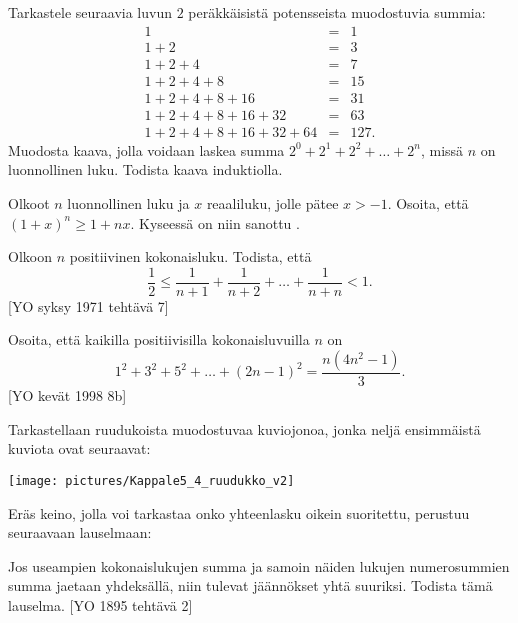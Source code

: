 \begin{kotitehtavasivu}
\begin{tehtava}
	Tarkastele seuraavia luvun $2$ peräkkäisistä potensseista muodostuvia summia:
	\[
	\begin{array}{rcl}
	1 &=& 1\\
	1 + 2 &=& 3\\
	1 + 2 + 4 &=& 7\\
	1 + 2 + 4 + 8 &=& 15\\
	1 + 2 + 4 + 8 + 16 &=& 31\\
	1 + 2 + 4 + 8 + 16 + 32 &=& 63\\
	1 + 2 + 4 + 8 + 16 + 32 + 64 &=& 127.
	\end{array}
	\]
	Muodosta kaava, jolla voidaan laskea summa $2^0 + 2^1 + 2^2 + \ldots + 2^n$, missä $n$ on luonnollinen luku. Todista kaava induktiolla.
\end{tehtava}

\begin{tehtava}
	Olkoot $n$ luonnollinen luku ja $x$ reaaliluku, jolle pätee $x > -1$. Osoita, että $(1 + x)^n \ge 1 + nx$. Kyseessä on niin sanottu .
\end{tehtava}

\begin{tehtava}
	Olkoon $n$ positiivinen kokonaisluku. Todista, että
	\[
	\frac{1}{2}\le\frac{1}{n+1}+\frac{1}{n+2}+\ldots +\frac{1}{n+n} <1.
	\]
	[YO syksy 1971 tehtävä 7]
\end{tehtava}

\begin{tehtava}
	Osoita, että kaikilla positiivisilla kokonaisluvuilla $n$ on
	\[
	1^2+3^2+5^2+\ldots+(2n-1)^2 = \frac{n(4n^2-1)}{3}. 
	\]
	[YO kevät 1998 8b]
\end{tehtava}

\begin{tehtava}
	Tarkastellaan ruudukoista muodostuvaa kuviojonoa, jonka neljä ensimmäistä kuviota ovat seuraavat:

	\begin{center}
	\texttt{[image: pictures/Kappale5\_4\_ruudukko\_v2]}
	\end{center}

\end{tehtava}

\begin{tehtava}
	Eräs keino, jolla voi tarkastaa onko yhteenlasku oikein suoritettu, perustuu seuraavaan lauselmaan:

	Jos useampien kokonaislukujen summa ja samoin näiden lukujen numerosummien summa jaetaan yhdeksällä, niin tulevat jäännökset yhtä suuriksi. Todista tämä lauselma.
	[YO 1895 tehtävä 2]
\end{tehtava}

\end{kotitehtavasivu}
